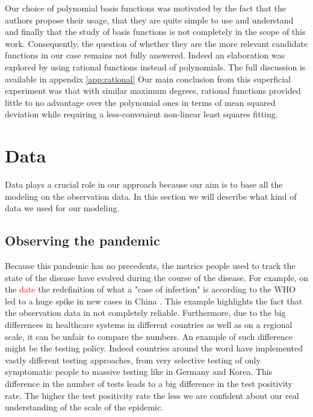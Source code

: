 \documentclass[12pt, letterpaper]{article}
\newcommand{\com}[1]{{\small {\fontfamily{ptm} \selectfont \textcolor{red}{#1}}}}
\begin{document}
Our choice of polynomial basis functions was motivated by the fact that the authors propose their usage, that they are quite simple to use and understand and finally that the study of basis functions is not completely in the scope of this work. 
Consequently, the question of whether they are the more relevant candidate functions in our case remains not fully answered. 
Indeed an elaboration was explored by using rational functions instead of polynomials. 
The full discussion is available in appendix \ref{app:rational}
Our main conclusion from this superficial experiment was that with similar maximum degrees, rational functions provided little to no advantage over the polynomial ones in terms of mean squared deviation while requiring a less-convenient non-linear least squares fitting.



\section{Data}

Data plays a crucial role in our approach because our aim is to base all the modeling on the observation data.
In this section we will describe what kind of data we used for our modeling.

\subsection{Observing the pandemic}

Because this pandemic has no precedents, the metrics people used to track the state of the disease have evolved during the course of the disease. 
For example, on the \com{date} the redefinition of what a "case of infection" is according to the WHO led to a huge spike in new cases in China \cite{}. 
This example highlights the fact that the observation data in not completely reliable. 
Furthermore, due to the big differences in healthcare systems in different countries as well as on a regional scale, it can be unfair to compare the numbers. 
An example of such difference might be the testing policy. 
Indeed countries around the word have implemented vastly different testing approaches, from very selective testing of only symptomatic people to massive testing like in Germany and Korea. This difference in the number of tests leads to a big difference in the test positivity rate. The higher the test positivity rate the less we are confident about our real understanding of the scale of the epidemic.
\end{document}
